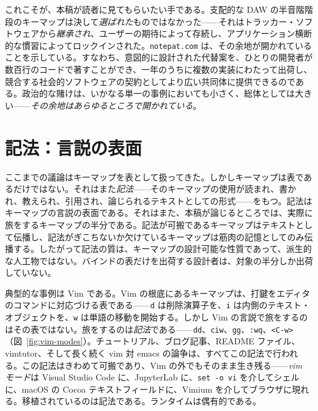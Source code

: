 \documentclass[10pt,letterpaper,twocolumn]{article}
\begin{document}
これこそが、本稿が読者に見てもらいたい手である。支配的な DAW の半音階階段のキーマップは決して\emph{選ばれた}ものではなかった——それはトラッカー・ソフトウェアから\emph{継承され}、ユーザーの期待によって存続し、アプリケーション横断的な慣習によってロックインされた。\texttt{notepat.com} は、その余地が開かれていることを示している。すなわち、意図的に設計された代替案を、ひとりの開発者が数百行のコードで著すことができ、一年のうちに複数の実装にわたって出荷し、競合する社会的ソフトウェアの契約としてより広い共同体に提供できるのである。政治的な賭けは、いかなる単一の事例においても小さく、総体としては大きい——\emph{その余地はあらゆるところで開かれている}。

\section{記法：言説の表面}
\label{sec:notation}

ここまでの議論はキーマップを表として扱ってきた。しかしキーマップは表であるだけではない。それはまた\emph{記法}——そのキーマップの使用が読まれ、書かれ、教えられ、引用され、論じられるテキストとしての形式——をもつ。記法はキーマップの言説の表面である。それはまた、本稿が論じるところでは、実際に旅をするキーマップの半分である。記法が可搬であるキーマップはテキストとして伝播し、記法がぎこちないか欠けているキーマップは筋肉の記憶としてのみ伝播する。したがって記法の質は、キーマップの設計可能な性質であって、派生的な人工物ではない。バインドの表だけを出荷する設計者は、対象の半分しか出荷していない。

典型的な事例は Vim である。Vim の根底にあるキーマップは、打鍵をエディタのコマンドに対応づける表である——\texttt{d} は削除演算子を、\texttt{i} は内側のテキスト・オブジェクトを、\texttt{w} は単語の移動を開始する。しかし Vim の言説で旅をするのはその表ではない。旅をするのは\emph{記法}である——\texttt{dd}、\texttt{ciw}、\texttt{gg}、\texttt{:wq}、\texttt{<C-w>}（図~\ref{fig:vim-modes}）。チュートリアル、ブログ記事、README ファイル、vimtutor、そして長く続く vim 対 emacs の論争は、すべてこの記法で行われる。この記法はきわめて可搬であり、Vim の外でもそのまま生き残る——\emph{vim モード}は Visual Studio Code に、JupyterLab に、\texttt{set -o vi} を介してシェルに、macOS の Cocoa テキストフィールドに、Vimium を介してブラウザに現れる。移植されているのは記法である。ランタイムは偶有的である。
\end{document}
